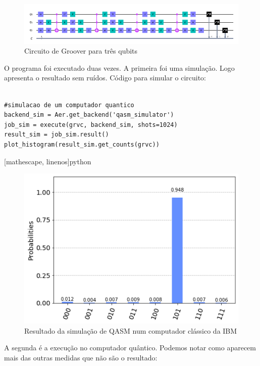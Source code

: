 \documentclass[12pt,a4paper]{article}
\begin{document}
\begin{figure}[h!]
    \centering
    \includegraphics[width=1\textwidth]{groover3qubits.png}
        \caption{Circuito de Groover para três qubits}
    \label{fig:orac101}
\end{figure}

O programa foi executado duas vezes. A primeira foi uma simulação. Logo apresenta o resultado sem ruídos. Código para simular o circuito:

\begin{verbatim}

#simulacao de um computador quantico
backend_sim = Aer.get_backend('qasm_simulator')
job_sim = execute(grvc, backend_sim, shots=1024)
result_sim = job_sim.result()
plot_histogram(result_sim.get_counts(grvc))
\end{verbatim}[mathescape, linenos]{python}



\begin{figure}[h!]
    \centering
    \includegraphics[width=1\textwidth]{grooversimu.png}
        \caption{Resultado da simulação de QASM num computador clássico da IBM}
    \label{fig:resultadogrooversimu}
\end{figure}

A segunda é a execução no computador quântico. Podemos notar como aparecem mais das outras medidas que não são o resultado:
\end{document}
